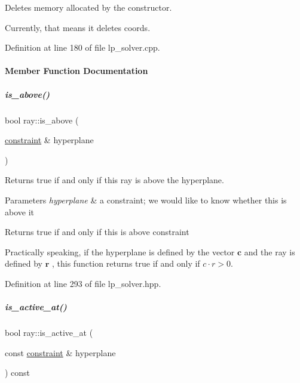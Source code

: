Deletes memory allocated by the constructor. 

Currently, that means it deletes {\ttfamily coords}. 

Definition at line 180 of file lp\+\_\+solver.\+cpp.



\paragraph{Member Function Documentation}
\mbox{\label{group___c_l_s_solvers_a5d4113ea6249145c337f4d26a54eb940}} 
\subparagraph{\texorpdfstring{is\+\_\+above()}{is\_above()}}
{\footnotesize\ttfamily bool ray\+::is\+\_\+above (\begin{DoxyParamCaption}\item[{\hyperlink{group___c_l_s_solvers_classconstraint}{constraint} \&}]{hyperplane }\end{DoxyParamCaption})\hspace{0.3cm}{\ttfamily [inline]}}



Returns {\ttfamily true} if and only if this ray is above the hyperplane. 


\begin{DoxyParams}{Parameters}
{\em hyperplane} & a constraint; we would like to know whether {\ttfamily this} is above it \\
\hline
\end{DoxyParams}
\begin{DoxyReturn}{Returns}
true if and only if {\ttfamily this} is above {\ttfamily constraint} 
\end{DoxyReturn}
Practically speaking, if the hyperplane is defined by the vector $ \mathbf c $ and the ray is defined by $ \mathbf r $ , this function returns true if and only if $ c\cdot r > 0 $. 

Definition at line 293 of file lp\+\_\+solver.\+hpp.

\mbox{\label{group___c_l_s_solvers_aa1831b718c9a91d786a1a578cb1cefea}} 
\subparagraph{\texorpdfstring{is\+\_\+active\+\_\+at()}{is\_active\_at()}}
{\footnotesize\ttfamily bool ray\+::is\+\_\+active\+\_\+at (\begin{DoxyParamCaption}\item[{const \hyperlink{group___c_l_s_solvers_classconstraint}{constraint} \&}]{hyperplane }\end{DoxyParamCaption}) const\hspace{0.3cm}{\ttfamily [inline]}}



